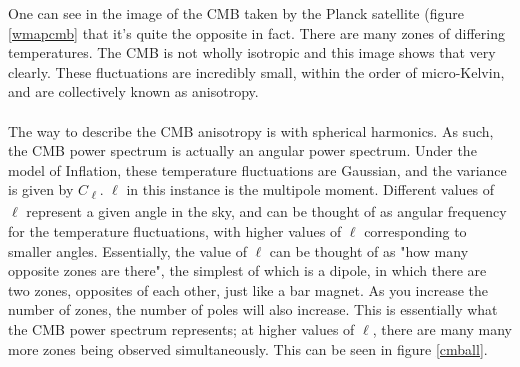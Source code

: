 \documentclass[twoside, fontsize=12pt,
     bibliography=totoc, %
     listof=totoc, %
     index=totoc, %
     onehalfspacing %
]{_MScDiss2017_cls}
\begin{document}
One can see in the image of the CMB taken by the Planck satellite (figure \ref{wmapcmb} that it's quite the opposite in fact. There are many zones of differing temperatures. The CMB is not wholly isotropic and this image shows that very clearly. These fluctuations are incredibly small, within the order of micro-Kelvin, and are collectively known as anisotropy. \cite{UCLA}

\paragraph{}

The way to describe the CMB anisotropy is with spherical harmonics. \cite{Berkeley} As such, the CMB power spectrum is actually an angular power spectrum. Under the model of Inflation, these temperature fluctuations are Gaussian, and the variance is given by $C$\textsubscript{$\ell$}. $\ell$ in this instance is the multipole moment. Different values of $\ell$ represent a given angle in the sky, and can be thought of as angular frequency for the temperature fluctuations, with higher values of $\ell$ corresponding to smaller angles. Essentially, the value of $\ell$ can be thought of as "how many opposite zones are there", the simplest of which is a dipole, in which there are two zones, opposites of each other, just like a bar magnet. As you increase the number of zones, the number of poles will also increase. This is essentially what the CMB power spectrum represents; at higher values of $\ell$, there are many many more zones being observed simultaneously. This can be seen in figure \ref{cmball}.
\end{document}
